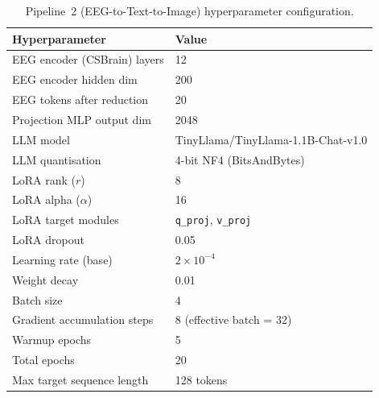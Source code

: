 \documentclass{article}
\begin{document}
\begin{table}[h]
  \centering
  \caption{Pipeline~2 (EEG-to-Text-to-Image) hyperparameter configuration.}
  \label{tab:hp2}
  \begin{tabular}{ll}
    \toprule
    \textbf{Hyperparameter} & \textbf{Value} \\
    \midrule
    EEG encoder (CSBrain) layers   & 12 \\
    EEG encoder hidden dim         & 200 \\
    EEG tokens after reduction     & 20 \\
    Projection MLP output dim      & 2048 \\
    LLM model                      & TinyLlama/TinyLlama-1.1B-Chat-v1.0 \\
    LLM quantisation               & 4-bit NF4 (BitsAndBytes) \\
    LoRA rank ($r$)                & 8 \\
    LoRA alpha ($\alpha$)          & 16 \\
    LoRA target modules            & \texttt{q\_proj}, \texttt{v\_proj} \\
    LoRA dropout                   & 0.05 \\
    Learning rate (base)           & $2 \times 10^{-4}$ \\
    Weight decay                   & 0.01 \\
    Batch size                     & 4 \\
    Gradient accumulation steps    & 8 (effective batch = 32) \\
    Warmup epochs                  & 5 \\
    Total epochs                   & 20 \\
    Max target sequence length     & 128 tokens \\
    \bottomrule
  \end{tabular}
\end{table}
\end{document}
